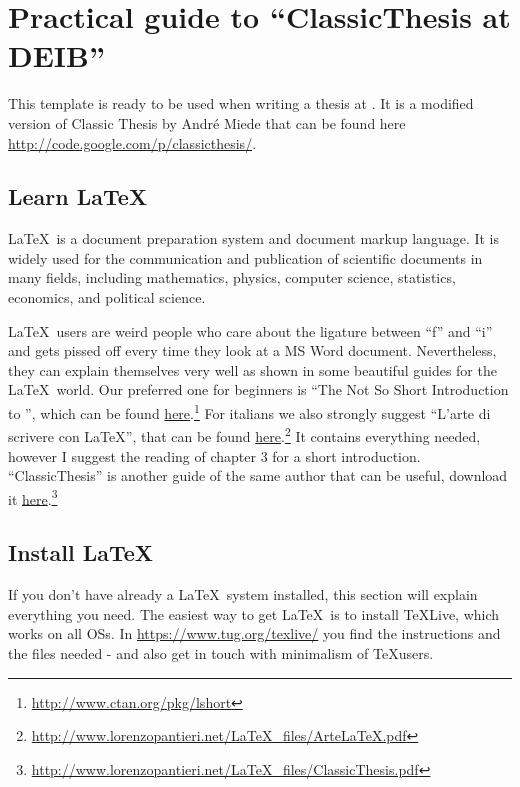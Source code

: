 
\chapter{Practical guide to \enquote{ClassicThesis at DEIB}}
\label{chap:conclusion}
This template is ready to be used when writing a thesis at \myDepartment.
It is a modified version of Classic Thesis by Andr\'e Miede that can be found here \url{http://code.google.com/p/classicthesis/}.

\section{Learn \LaTeX}
\LaTeX\ is a document preparation system and document markup language.
It is widely used for the communication and publication of scientific documents in many fields, including mathematics, physics, computer science, statistics, economics, and political science.

\LaTeX\ users are weird people who care about the ligature between \enquote{f} and \enquote{i} and gets pissed off every time they look at a MS Word document.
Nevertheless, they can explain themselves very well as shown in some beautiful guides for the \LaTeX\ world.
Our preferred one for beginners is \enquote{The Not So Short Introduction to \LaTeXe}, which can be found \href{http://www.ctan.org/pkg/lshort}{here}.\footnote{\url{http://www.ctan.org/pkg/lshort}}
For italians we also strongly suggest \enquote{L'arte di scrivere con \LaTeX}, that can be found \href{http://www.lorenzopantieri.net/LaTeX_files/ArteLaTeX.pdf}{here}.\footnote{\url{http://www.lorenzopantieri.net/LaTeX_files/ArteLaTeX.pdf}}
It contains everything needed, however I suggest the reading of chapter 3 for a short introduction. \enquote{ClassicThesis} is another guide of the same author that can be useful, download it \href{http://www.lorenzopantieri.net/LaTeX_files/ClassicThesis.pdf}{here}.\footnote{\url{http://www.lorenzopantieri.net/LaTeX_files/ClassicThesis.pdf}}

\section{Install \LaTeX}
If you don't have already a \LaTeX\ system installed, this section will explain everything you need.
The easiest way to get \LaTeX\ is to install TeXLive, which works on all \acp{OS}.
In \url{https://www.tug.org/texlive/} you find the instructions and the files needed - and also get in touch with minimalism of \TeX users. 


